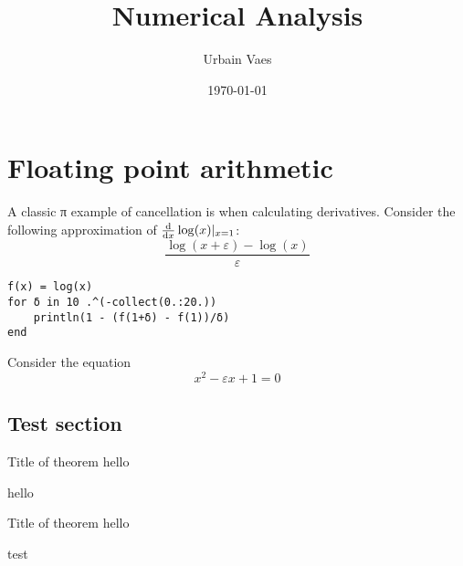 \documentclass[11pt,a4paper]{report}
\title{Numerical Analysis}
\author{Urbain Vaes}
\date{\today}
\begin{document}
\maketitle



\tableofcontents

\chapter{Floating point arithmetic}%
\label{cha:rounding_errors}

\begin{example}
\end{example}

\begin{example}
    A classic π example of cancellation is when calculating derivatives.
    Consider the following approximation of $\frac{\mathrm d}{\mathrm d x}\log(x) \vert_{x=1}$:
    \[
        	\frac{\log(x + \varepsilon) - \log(x)}{\varepsilon}
    \]
\begin{verbatim}
f(x) = log(x)
for δ in 10 .^(-collect(0.:20.))
    println(1 - (f(1+δ) - f(1))/δ)
end
\end{verbatim}
\end{example}

\begin{example}
    Consider the equation
    \[
        x^2 - \varepsilon x + 1 = 0
    \]
\end{example}

\section{Test section}%
\label{sec:test_section}

\begin{theorem}
    {Title of theorem}
    \label{thm:test}
    hello
\end{theorem}

\begin{example}
    hello
\end{example}

\begin{lemma}
    {Title of theorem}
    \label{lemma:test}
    hello
\end{lemma}

\begin{remark}
    [Hello]
    test
\end{remark}
\end{document}
